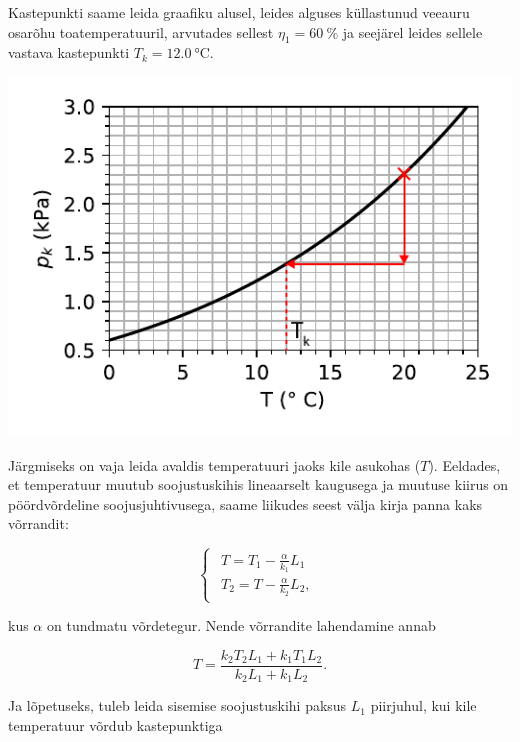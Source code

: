 Kastepunkti saame leida graafiku alusel, leides alguses küllastunud
veeauru osarõhu toatemperatuuril, arvutades sellest $\eta_{1}=\SI{60}{\percent}$
ja seejärel leides sellele vastava kastepunkti $T_{k}=\SI{12.0}{\degreeCelsius}.$
\begin{center}
\includegraphics[scale=0.9]{2018-v3g-05-kullastunud-aur-lah}
\par\end{center}

Järgmiseks on vaja leida avaldis temperatuuri jaoks kile asukohas
($T$). Eeldades, et temperatuur muutub soojustuskihis lineaarselt
kaugusega ja muutuse kiirus on pöördvõrdeline soojusjuhtivusega, saame
liikudes seest välja kirja panna kaks võrrandit:

\begin{equation*}
\begin{cases}
\begin{array}{c}
T=T_{1}-\frac{\alpha}{k_{1}}L_{1}\\
T_{2}=T-\frac{\alpha}{k_{2}}L_{2},
\end{array}
\end{cases}
\end{equation*}

\noindent kus $\alpha$ on tundmatu võrdetegur. Nende võrrandite lahendamine
annab

\begin{equation*}
T=\frac{k_{2}T_{2}L_{1}+k_{1}T_{1}L_{2}}{k_{2}L_{1}+k_{1}L_{2}}.
\end{equation*}

Ja lõpetuseks, tuleb leida sisemise soojustuskihi paksus $L_{1}$
piirjuhul, kui kile temperatuur võrdub kastepunktiga

